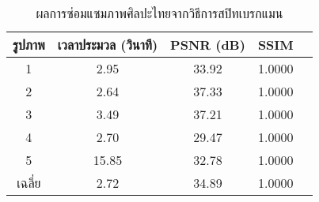 \begin{table}[H]
    \centering
    \begin{tabular}[ht]{|c|c|c|c|c|}
        \hline
        รูปภาพ &เวลาประมวล  (วินาที) & PSNR (dB) & SSIM \\
        \hline
        1 & 2.95 & 33.92 & 1.0000 \\ 
        2 & 2.64 & 37.33 & 1.0000 \\
        3 &  3.49 & 37.21 & 1.0000 \\
        4 & 2.70  & 29.47  & 1.0000 \\
        5 & 15.85  & 32.78  & 1.0000 \\
        \hline
        เฉลี่ย & 2.72  & 34.89  & 1.0000 \\
        \hline
    \end{tabular}
    \caption{ผลการซ่อมแซมภาพศิลปะไทยจากวิธีการสปิทเบรกแมน}
    \label{table:ex4-splitbregman}
\end{table}